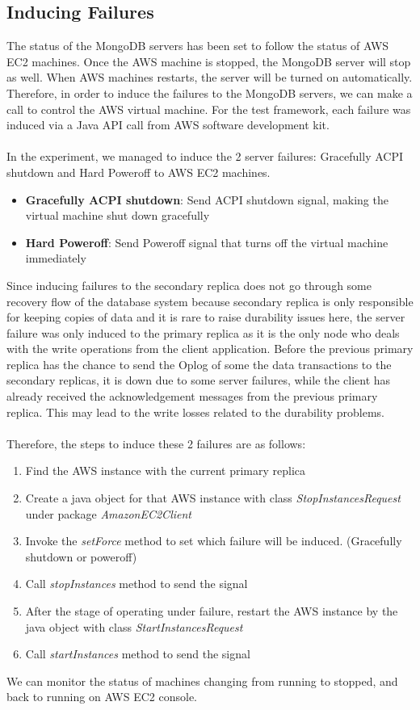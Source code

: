 \documentclass[12pt]{article}
\begin{document}
\subsection{Inducing Failures}
The status of the MongoDB servers has been set to follow the status of AWS EC2 machines. Once the AWS machine is stopped, the MongoDB server will stop as well. When AWS machines restarts, the server will be turned on automatically. Therefore, in order to induce the failures to the MongoDB servers, we can make a call to control the AWS virtual machine. For the test framework, each failure was induced via a Java API call from AWS software development kit.\\
\\
In the experiment, we managed to induce the 2 server failures: Gracefully ACPI shutdown and Hard Poweroff to AWS EC2 machines.\\
\begin{itemize}
  \item \textbf{Gracefully ACPI shutdown}: Send ACPI shutdown signal, making the virtual machine shut down gracefully
  \item \textbf{Hard Poweroff}: Send Poweroff signal that turns off the virtual machine immediately
\end{itemize}
Since inducing failures to the secondary replica does not go through some recovery flow of the database system because secondary replica is only responsible for keeping copies of data and it is rare to raise durability issues here, the server failure was only induced to the primary replica as it is the only node who deals with the write operations from the client application. Before the previous primary replica has the chance to send the Oplog of some the data transactions to the secondary replicas, it is down due to some server failures, while the client has already received the acknowledgement messages from the previous primary replica. This may lead to the write losses related to the durability problems. \\
\\
Therefore, the steps to induce these 2 failures are as follows:
\begin{enumerate}
  \item Find the AWS instance with the current primary replica
  \item Create a java object for that AWS instance with class \textit{StopInstancesRequest} under package \textit{AmazonEC2Client}
  \item Invoke the \textit{setForce} method to set which failure will be induced. (Gracefully shutdown or poweroff)
  \item Call \textit{stopInstances} method to send the signal
  \item After the stage of operating under failure, restart the AWS instance by the java object with class \textit{StartInstancesRequest}
  \item Call \textit{startInstances} method to send the signal
\end{enumerate}
We can monitor the status of machines changing from running to stopped, and back to running on AWS EC2 console.\\
\end{document}
